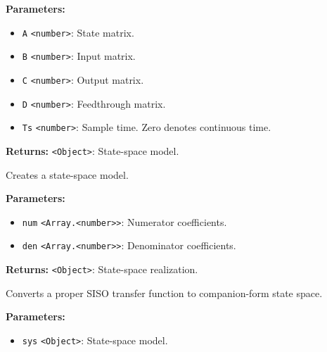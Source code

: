 \documentclass[12pt,a4paper]{article}
\begin{document}
\vspace{5mm}
\noindent {}


\noindent \textbf{Parameters:}
\begin{itemize}
  \item \texttt{A} \texttt{<number>}: State matrix.
  \item \texttt{B} \texttt{<number>}: Input matrix.
  \item \texttt{C} \texttt{<number>}: Output matrix.
  \item \texttt{D} \texttt{<number>}: Feedthrough matrix.
  \item \texttt{Ts} \texttt{<number>}: Sample time. Zero denotes continuous time.
\end{itemize}

\noindent \textbf{Returns:} \texttt{<Object>}: State-space model.

\noindent Creates a state-space model.

\vspace{5mm}
\noindent {}


\noindent \textbf{Parameters:}
\begin{itemize}
  \item \texttt{num} \texttt{<Array.<number>>}: Numerator coefficients.
  \item \texttt{den} \texttt{<Array.<number>>}: Denominator coefficients.
\end{itemize}

\noindent \textbf{Returns:} \texttt{<Object>}: State-space realization.

\noindent Converts a proper SISO transfer function to companion-form state space.

\vspace{5mm}
\noindent {}


\noindent \textbf{Parameters:}
\begin{itemize}
  \item \texttt{sys} \texttt{<Object>}: State-space model.
\end{itemize}
\end{document}
